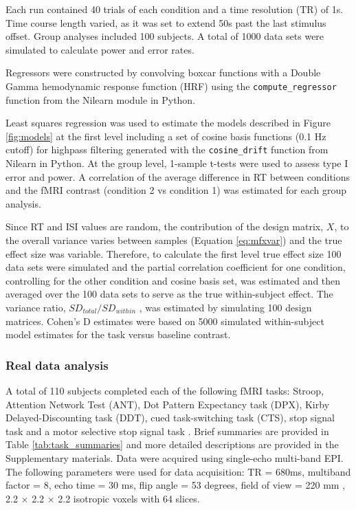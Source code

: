 \documentclass[titlepage,12pt] {article}
\begin{document}
Each run contained 40 trials of each condition and a time resolution (TR) of 1s.  Time course length varied, as it was set to extend 50s past the last stimulus offset.  Group analyses included 100 subjects.  A total of 1000 data sets were simulated to calculate power and error rates. 


Regressors were constructed by convolving boxcar functions with a Double Gamma hemodynamic response function (HRF) using the \verb+compute_regressor+ function from the Nilearn module in Python.  

Least squares regression was used to estimate the models described in Figure \ref{fig:models} at the first level including a set of cosine basis functions (0.1 Hz cutoff) for highpass filtering generated with the \verb+cosine_drift+ function from Nilearn in Python.  At the group level, 1-sample t-tests were used to assess type I error and power.  A correlation of the average difference in RT between conditions and the fMRI contrast (condition 2 vs condition 1) was estimated for each group analysis.  

Since RT and ISI values are random, the contribution of the design matrix, $X$, to the overall variance varies between samples (Equation \ref{eq:mfxvar}) and the true effect size was variable.  Therefore, to calculate the first level true effect size 100 data sets were simulated and the partial correlation coefficient for one condition, controlling for the other condition and cosine basis set, was estimated and then averaged over the 100 data sets to serve as the true within-subject effect. The variance ratio, $SD_{total}/SD_{within}$ , was estimated by simulating 100 design matrices.  Cohen's D estimates were based on 5000 simulated within-subject model estimates for the task versus baseline contrast.

\subsubsection*{Real data analysis}

A total of 110 subjects completed each of the following fMRI tasks: Stroop, Attention Network Test (ANT), Dot Pattern Expectancy task (DPX), Kirby Delayed-Discounting task (DDT), cued task-switching task (CTS), stop signal task and a motor selective stop signal task \citep{fanTestingEfficiencyIndependence2002, macdonaldBuildingClinicallyRelevant2008, kirby2009, ruge2005, logan1984, bissett2014}.  Brief summaries are provided in Table \ref{tab:task_summaries} and more detailed descriptions are provided in the Supplementary materials.  Data were acquired using single-echo multi-band EPI. The following parameters were used for data acquisition: TR = 680ms, multiband factor = 8, echo time = 30 ms, flip angle = 53 degrees, field of view = 220 mm , 2.2 $\times$ 2.2 $\times$ 2.2 isotropic voxels with 64 slices.
\end{document}
